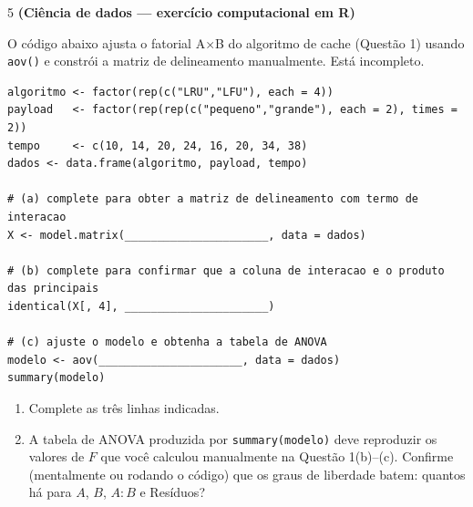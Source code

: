 \documentclass[11pt]{article}
\begin{document}
\begin{questao}{5} \textbf{(Ciência de dados --- exercício computacional em R)}

O código abaixo ajusta o fatorial A×B do algoritmo de cache (Questão 1) usando \texttt{aov()} e
constrói a matriz de delineamento manualmente. Está incompleto.

\begin{lstlisting}
algoritmo <- factor(rep(c("LRU","LFU"), each = 4))
payload   <- factor(rep(rep(c("pequeno","grande"), each = 2), times = 2))
tempo     <- c(10, 14, 20, 24, 16, 20, 34, 38)
dados <- data.frame(algoritmo, payload, tempo)

# (a) complete para obter a matriz de delineamento com termo de interacao
X <- model.matrix(______________________, data = dados)

# (b) complete para confirmar que a coluna de interacao e o produto das principais
identical(X[, 4], ______________________)

# (c) ajuste o modelo e obtenha a tabela de ANOVA
modelo <- aov(______________________, data = dados)
summary(modelo)
\end{lstlisting}

\begin{enumerate}[label=(\alph*)]
  \item Complete as três linhas indicadas.
  \item A tabela de ANOVA produzida por \texttt{summary(modelo)} deve reproduzir os valores de
    $F$ que você calculou manualmente na Questão 1(b)--(c). Confirme (mentalmente ou rodando o
    código) que os graus de liberdade batem: quantos há para $A$, $B$, $A{:}B$ e Resíduos?
\end{enumerate}
\end{questao}
\end{document}
